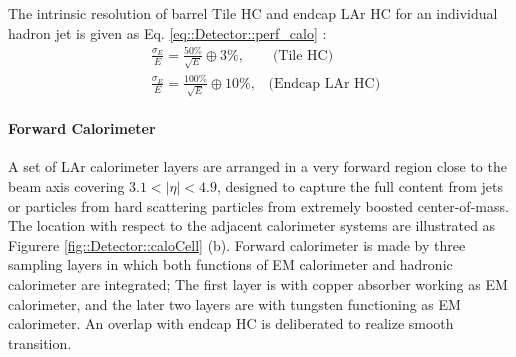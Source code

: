 The intrinsic resolution of barrel Tile HC and endcap LAr HC for an individual hadron jet is given as Eq. \ref{eq::Detector::perf_calo} \cite{ATLAS_Tile_TDR}: \\
\begin{align}
& \frac{\sigma_E}{E} = \frac{50\%}{\sqrt{E}} \oplus 3\%, \,\,\,\,\,\,\,\,\,\,\,\,  \mbox{(Tile HC)} \\
& \frac{\sigma_E}{E} = \frac{100\%}{\sqrt{E}} \oplus 10\%,  \,\,\,\,\, \mbox{(Endcap LAr HC)}
\label{eq::Detector::perf_calo}
\end{align}


\paragraph{Forward Calorimeter}
A set of LAr calorimeter layers are arranged in a very forward region close to the beam axis covering $3.1<|\eta|<4.9$, 
designed to capture the full content from jets or particles from hard scattering particles from extremely boosted center-of-mass. The location with respect to the adjacent calorimeter systems are illustrated as Figurere \ref{fig::Detector::caloCell} (b).
Forward calorimeter is made by three sampling layers in which both functions of EM calorimeter and hadronic calorimeter are integrated; The first layer is with copper absorber working as EM calorimeter, and the later two layers are with tungsten functioning as EM calorimeter. An overlap with endcap HC is deliberated to realize smooth transition. \\

